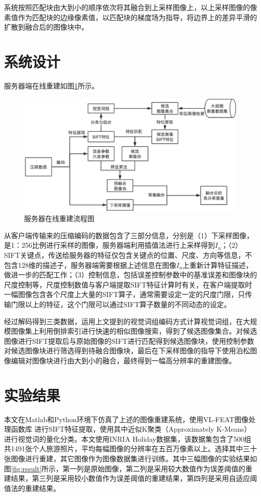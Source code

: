 \documentclass[UTF8]{csoarticle}
\begin{document}
系统按照匹配块由大到小的顺序依次将其融合到上采样图像上，以上采样图像的像素值作为匹配块的边缘像素值，以匹配块的梯度场为指导，将边界上的差异平滑的扩散到融合后的图像块中。

\section{系统设计}

服务器端在线重建如图\ref{fig:serverOnline}所示。
\begin{figure}
\centering\includegraphics[width=15cm]{serverOnline}
\caption{服务器在线重建流程图}
\label{fig:serverOnline}
\end{figure}
从客户端传输来的压缩编码的数据包含了三部分信息，分别是（1）下采样图像，是1：256比例进行采样的图像，服务器端利用插值法进行上采样得到\(I_u\)；（2）SIFT关键点，传送给服务器的特征仅包含关键点的位置、尺度、方向等信息，不包含128维的描述子，服务器端需要根据上述信息在图像\(I_u\)上重新计算特征描述，做进一步的匹配工作；（3）控制信息，包括误差控制参数中的基准误差和图像块的尺度控制等，尺度控制数值与客户端提取SIFT特征计算时有关，在客户端提取时一幅图像包含各个尺度上大量的SIFT算子，通常需要设定一定的尺度门限，只传输门限以上的特征，这个门限可以通过SIFT算子数量的不同动态的设定。

经过解码得到三类数据，运用上文提到的视觉词组编码方式计算视觉词组，在大规模图像集上利用倒排索引进行快速的相似图像搜索，得到了候选图像集合。对候选图像进行SIFT提取后与原始图像的SIFT进行匹配得到候选图像块，使用控制参数对候选图像块进行筛选得到待融合图像块，最后在下采样图像的指导下使用泊松图像编辑对图像块进行由大到小的融合，最终得到一幅高分辨率的重建图像。

\section{实验结果}
本文在Matlab和Python环境下仿真了上述的图像重建系统，使用VL-FEAT图像处理函数库
进行SIFT特征提取，使用其中近似K聚类（Approximately K-Means）进行视觉词的量化分类。本文使用INRIA Holiday数据集，该数据集包含了500组共1491张个人旅游照片，平均每幅图像的分辨率在五百万像素以上。选择其中三十张图像进行重建，其它图像作为图像数据集进行训练。其中三幅图像的实验结果如图\ref{fig:result}所示，第一列是原始图像，第二列是采用较大数值作为误差阈值的重建结果，第三列是采用较小数值作为误差阈值的重建结果，第四列是采用自适应阈值法的重建结果。
\end{document}
